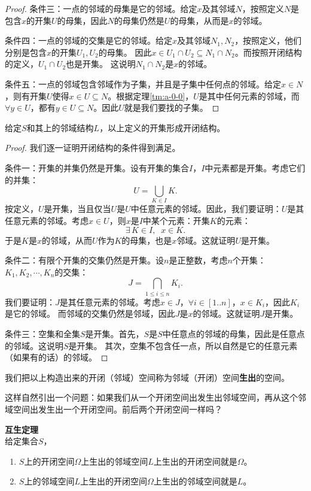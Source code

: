 \documentclass[12pt,UTF8]{ctexbook}
\begin{document}
\begin{appendix}
\begin{proof}
    条件三：一点的邻域的母集是它的邻域。给定$x$及其邻域$N$，按照定义$N$是包含$x$的开集$U$的母集，因此$N$的母集仍然是$U$的母集，从而是$x$的邻域。

    条件四：一点的邻域的交集是它的邻域。给定$x$及其邻域$N_1, N_2$，按照定义，他们分别是包含$x$的开集$U_1, U_2$的母集。
    因此$x\in U_1\cap U_2 \subseteq N_1\cap N_2 $。而按照开闭结构的定义，$U_1\cap  U_2$也是开集。
    这说明$N_1\cap N_2$是$x$的邻域。

    条件五：一点的邻域包含邻域作为子集，并且是子集中任何点的邻域。给定$x\in N$，则有开集$U$使得$x\in U \subseteq N$。根据定理\ref{tm:a-0-0}，$U$是其中任何元素的邻域，而$\forall y \in U$，都有$y\in U \subseteq N$。因此$U$就是我们要找的子集。
\end{proof}

\begin{tm}
    给定$S$和其上的邻域结构$L$，以上定义的开集形成开闭结构。
\end{tm}

\begin{proof}
    我们逐一证明开闭结构的条件得到满足。

    条件一：开集的并集仍然是开集。设有开集的集合$I$，$I$中元素都是开集。考虑它们的并集：
    $$ U = \bigcup_{K\in I} K. $$
    按定义，$U$是开集，当且仅当$U$是$U$中任意元素的邻域。因此，我们要证明：$U$是其任意元素的邻域。考虑$x\in U$，则$x$是$I$中某个元素：开集$K$的元素：
    $$ \exists \, K \in I, \;\; x \in K.$$
    于是$K$是$x$的邻域，从而$U$作为$K$的母集，也是$x$邻域。这就证明$U$是开集。

    条件二：有限个开集的交集仍然是开集。设$n$是正整数，考虑$n$个开集：$K_1, K_2, \cdots, K_n$的交集：
    $$ J = \bigcap_{1\leqslant i \leqslant n} K_i.$$
    我们要证明：$J$是其任意元素的邻域。考虑$x\in J$，$\forall i\in [1..n]$，$x\in K_i$，因此$K_i$是它的邻域。
    而邻域的交集仍然是邻域，因此$J$是$x$的邻域。这就证明$J$是开集。

    条件三：空集和全集$S$是开集。首先，$S$是$S$中任意点的邻域的母集，因此是任意点的邻域。这说明$S$是开集。
    其次，空集不包含任一点，所以自然是它的任意元素（如果有的话）的邻域。

\end{proof}

我们把以上构造出来的开闭（邻域）空间称为邻域（开闭）空间\textbf{生出}的空间。

这样自然引出一个问题：如果我们从一个开闭空间出发生出邻域空间，再从这个邻域空间出发生出一个开闭空间。前后两个开闭空间一样吗？

\begin{tm}{\textbf{互生定理}}
    \mbox{} \\
    给定集合$S$，
    \begin{enumerate}
        \item $S$上的开闭空间$\Omega$上生出的邻域空间$L$上生出的开闭空间就是$\Omega$。
        \item $S$上的邻域空间$L$上生出的开闭空间$\Omega$上生出的邻域空间就是$L$。
    \end{enumerate}
\end{tm}


\end{appendix}
\end{document}
